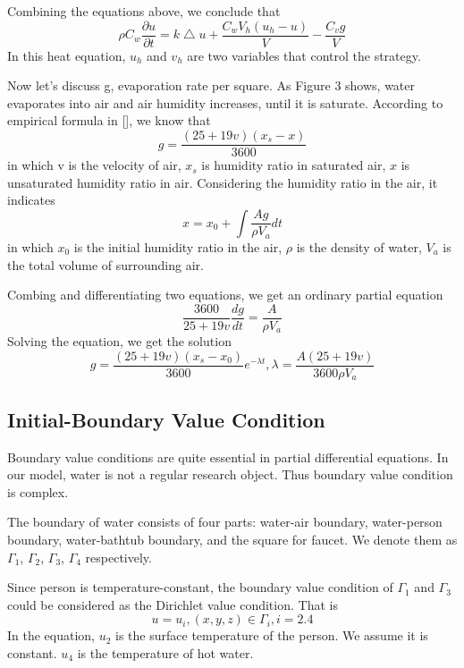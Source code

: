 \documentclass[12pt,a4paper,titlepage]{article}
\begin{document}
Combining the equations above, we conclude that
\begin{equation}
\rho C_{w}\frac{\partial u}{\partial t}=k\bigtriangleup u+\frac{C_w V_h(u_h-u)}{V}-\frac{C_v g}{V}%
\end{equation}
In this heat equation, $u_h$ and $v_h$ are two variables that control the strategy.

Now let's discuss g, evaporation rate per square.
As Figure 3 shows, water evaporates into air and air humidity increases, until it is saturate. According to empirical formula in [], we know that
\begin{equation}
 g=\frac{(25+19v)({x_s}-x)}{3600}
\end{equation}
in which v is the velocity of air, ${x_s}$ is humidity ratio in saturated air, $x$ is unsaturated humidity ratio in air.
Considering the humidity ratio in the air, it indicates
\begin{equation}
 x=x_0+\int \frac{Ag}{\rho V_a}dt
\end{equation}
in which $x_0$ is the initial humidity ratio in the air, $\rho$ is the density of water, $V_a$ is the total volume of surrounding air.

Combing and differentiating two equations, we get an ordinary partial equation
\begin{equation}
 \frac{3600}{25+19v} \frac{dg}{dt}=\frac{A}{\rho {V_a}}
\end{equation}
Solving the equation, we get the solution
\begin{equation}
 g=\frac{(25+19v)({x_s}-{x_0})}{3600}e^{-\lambda t}, \lambda =\frac{A(25+19v)}{3600\rho {V_a}}
\end{equation}


\subsection{Initial-Boundary Value Condition}
\label{initial-boundary value condition}

Boundary value conditions are quite essential in partial differential equations. In our model, water is not a regular research object.
Thus boundary value condition is complex.

The boundary of water consists of four parts: water-air boundary, water-person boundary, water-bathtub boundary, and the square for faucet. We denote them as
${\Gamma}_1$, ${\Gamma}_2$, ${\Gamma}_3$, ${\Gamma}_4$ respectively.

Since person is temperature-constant, the boundary value condition of ${\Gamma}_1$ and ${\Gamma}_3$ could be considered
as the Dirichlet value condition. That is
\begin{equation}
 u=u_i, (x,y,z)\in {\Gamma}_i, i=2.4
\end{equation}
In the equation, $u_2$ is the surface temperature of the person. We assume it is constant. $u_4$ is the temperature of hot water.
\end{document}

